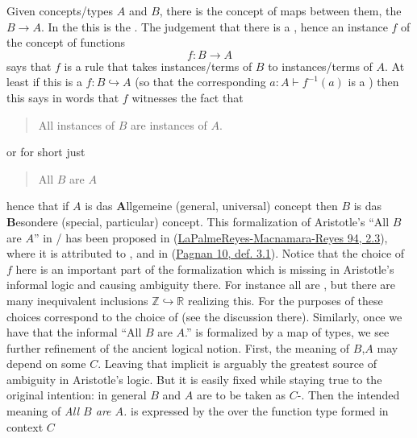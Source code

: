 \documentclass[12pt,titlepage]{article}
\theoremstyle{plain}
\theoremstyle{definition}
\theoremstyle{remark}
\begin{document}
Given concepts/types $A$ and $B$, there is the concept of maps between them, the  $B\to A$. In the  this is the .
The judgement that there is a , hence an instance $f$ of the concept of functions
\begin{displaymath}
f \colon B \longrightarrow A
\end{displaymath}
says that $f$ is a rule that takes instances/terms of $B$ to instances/terms of $A$. At least if this is a  $f \colon B \hookrightarrow A$ (so that the corresponding $a\colon A \vdash f^{-1}(a)$ is a ) then this says in words that $f$ witnesses the fact that
\begin{quote}%
All instances of $B$ are instances of $A$.
\end{quote}
or for short just
\begin{quote}%
All $B$ are $A$
\end{quote}
hence that if $A$ is das \textbf{A}llgemeine (general, universal) concept then $B$ is das \textbf{B}esondere (special, particular) concept.
This formalization of Aristotle's ``All $B$ are $A$'' in / has been proposed in (\hyperlink{PalmeReyesMacnamaraReyes94}{LaPalmeReyes-Macnamara-Reyes 94, 2.3}), where it is attributed to , and in (\hyperlink{Pagnan10}{Pagnan 10, def. 3.1}).
Notice that the choice of $f$ here is an important part of the formalization which is missing in Aristotle's informal logic and causing ambiguity there.
For instance all  are , but there are many inequivalent  inclusions $\mathbb{Z}\hookrightarrow \mathbb{R}$ realizing this. For the purposes of  these choices correspond to the choice of  (see the discussion there).
Similarly, once we have that the informal ``All $B$ are $A$.'' is formalized by a map of types, we see further refinement of the ancient logical notion.
First, the meaning of $B$,$A$ may depend on some  $C$. Leaving that implicit is arguably the greatest source of ambiguity in Aristotle's logic. But it is easily fixed while staying true to the original intention: in general $B$ and $A$ are to be taken as $C$-. Then the intended meaning of \emph{All $B$ are $A$.} is expressed by the  over the function type formed in context $C$
\end{document}
